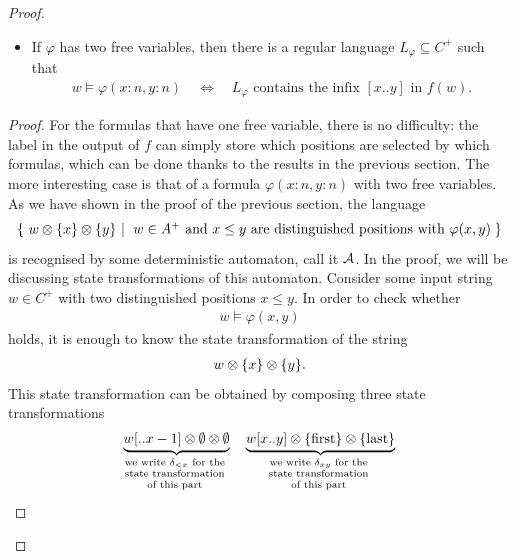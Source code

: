 \begin{proof}
\begin{lemma}
\begin{itemize}
            \item If $\varphi$ has two free variables, then there is a regular language $L_\varphi \subseteq C^+$ such that 
            \begin{align*}            w \models \varphi(x: n, y : n) \quad \iff \quad L_\varphi \text{ contains the infix  $[x..y]$ in $f(w)$.}
            \end{align*}
        \end{itemize}
    \end{lemma}
    \begin{proof} For the formulas that have one free variable, there is no difficulty: the label in the output of $f$ can simply store which positions are selected by which formulas, which can be done thanks to the results in the previous section. The more interesting case is that of a formula $\varphi(x:n, y:n)$ with two free variables.
        As we have shown in the proof of the previous section, the language
        \begin{align*}
        \setbuild{w  \otimes \set{x} \otimes \set{y}}{$w \in A^+$ and $x \leq y$ are distinguished positions with $\varphi(x,y)$}
        \end{align*}
        is recognised by some deterministic automaton, call it ${\mathcal A}$. In the proof, we will be discussing state transformations of this automaton.  Consider some input string $w \in C^+$ with two distinguished positions $ x \leq y$. In order to check whether
        \begin{align*}
            w \models \varphi(x,y)
        \end{align*}
        holds, it is enough to know the state transformation of the string 
        \begin{align}\label{eq:state-transformation-for-logic}
         w \otimes \{x\} \otimes \{y\}.
        \end{align}
        This state  transformation  can be obtained by composing three state transformations
        \begin{align*}
        \myunderbrace{w[..x-1] \otimes \emptyset \otimes \emptyset}{we write $\delta_{<x}$ for the \\  state transformation \\ of this part}
        \quad 
        \myunderbrace{w[ x .. y ] \otimes \set{\text{first}} \otimes \set{\text{last}}}{we write $\delta_{xy}$ for the \\ state transformation \\ of this part}

\end{align*}
\end{proof}
\end{proof}
